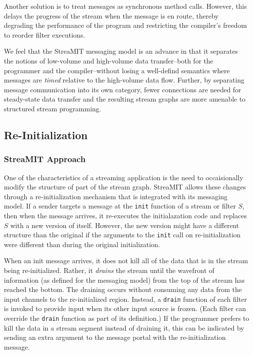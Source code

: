 Another solution is to treat messages as synchronous method calls.
However, this delays the progress of the stream when the message is en
route, thereby degrading the performance of the program and
restricting the compiler's freedom to reorder filter executions.  

We feel that the StreaMIT messaging model is an advance in that it
separates the notions of low-volume and high-volume data
transfer--both for the programmer and the compiler--without losing a
well-defind semantics where messages are {\it timed} relative to the
high-volume data flow.  Further, by separating message communication
into its own category, fewer connections are needed for steady-state
data transfer and the resulting stream graphs are more amenable to
structured stream programming.

\subsection{Re-Initialization}
\label{sec:reinit}

\subsubsection{StreaMIT Approach}

One of the characteristics of a streaming application is the need to
occaisionally modify the structure of part of the stream graph.
StreaMIT allows these changes through a re-initialization mechanism
that is integrated with its messaging model.  If a sender targets a
message at the {\tt init} function of a stream or filter $S$, then
when the message arrives, it re-executes the initialazation code and
replaces $S$ with a new version of itself.  However, the new version
might have a different structure than the original if the arguments to
the {\tt init} call on re-initialization were different than during
the original initialization.

When an init message arrives, it does not kill all of the data that is
in the stream being re-initialized.  Rather, it {\it drains} the
stream until the wavefront of information (as defined for the
messaging model) from the top of the stream has reached the bottom.
The draining occurs without consuming any data from the input channels
to the re-initialized region.  Instead, a {\tt drain} function of each
filter is invoked to provide input when its other input source is
frozen.  (Each filter can override the {\tt drain} function as part of
its definition.)  If the programmer prefers to kill the data in a
stream segment instead of draining it, this can be indicated by
sending an extra argument to the message portal with the
re-initialization message.

